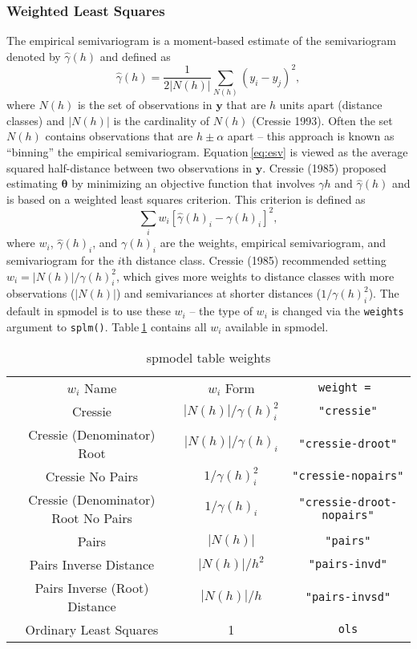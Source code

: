 \documentclass{article}
\begin{document}
\hypertarget{weighted-least-squares}{%
\subsubsection{Weighted Least Squares}\label{weighted-least-squares}}

The empirical semivariogram is a moment-based estimate of the
semivariogram denoted by \(\hat{\gamma}(h)\) and defined as
\begin{equation}\label{eq:esv}
  \hat{\gamma}(h) = \frac{1}{2|N(h)|} \sum_{N(h)} (y_i - y_j)^2, 
\end{equation} where \(N(h)\) is the set of observations in
\(\mathbf{y}\) that are \(h\) units apart (distance classes) and
\(|N(h)|\) is the cardinality of \(N(h)\) (Cressie 1993). Often the set
\(N(h)\) contains observations that are \(h \pm \alpha\) apart -- this
approach is known as ``binning'' the empirical semivariogram.
Equation\(~\)\eqref{eq:esv} is viewed as the average squared
half-distance between two observations in \(\mathbf{y}\). Cressie (1985)
proposed estimating \(\bm{\theta}\) by minimizing an objective function
that involves \(\gamma{h}\) and \(\hat{\gamma}(h)\) and is based on a
weighted least squares criterion. This criterion is defined as
\begin{equation}\label{eq:svwls}
  \sum_i w_i [\hat{\gamma}(h)_i - \gamma(h)_i]^2,
\end{equation} where \(w_i\), \(\hat{\gamma}(h)_i\), and \(\gamma(h)_i\)
are the weights, empirical semivariogram, and semivariogram for the
\(i\)th distance class. Cressie (1985) recommended setting
\(w_i = |N(h)| / \gamma(h)_i^2\), which gives more weights to distance
classes with more observations (\(|N(h)|\)) and semivariances at shorter
distances (\(1 / \gamma(h)_i^2\)). The default in spmodel is to use
these \(w_i\) -- the type of \(w_i\) is changed via the \texttt{weights}
argument to \texttt{splm()}. Table\(~\)\ref{tab:weights} contains all
\(w_i\) available in spmodel.

\begin{table}\label{tab:weights}
  \centering
  \begin{tabular}{c|c|c}
  \hline
  $w_i$ Name & $w_i$ Form & \texttt{weight = } \\
  Cressie & $|N(h)| / \gamma(h)_i^2$ & \texttt{"cressie"} \\
  Cressie (Denominator) Root & $|N(h)| / \gamma(h)_i$ & \texttt{"cressie-droot"} \\
  Cressie No Pairs & $1 / \gamma(h)_i^2$ & \texttt{"cressie-nopairs"} \\
  Cressie (Denominator) Root No Pairs & $1 / \gamma(h)_i$ & \texttt{"cressie-droot-nopairs"} \\
  Pairs & $|N(h)|$ & \texttt{"pairs"} \\
  Pairs Inverse Distance & $|N(h)| / h^2$ & \texttt{"pairs-invd"} \\
  Pairs Inverse (Root) Distance & $|N(h)| / h$ & \texttt{"pairs-invsd"} \\
  Ordinary Least Squares & 1 & \texttt{ols}
  \end{tabular}
  \caption{spmodel table weights}
\end{table}
\end{document}

